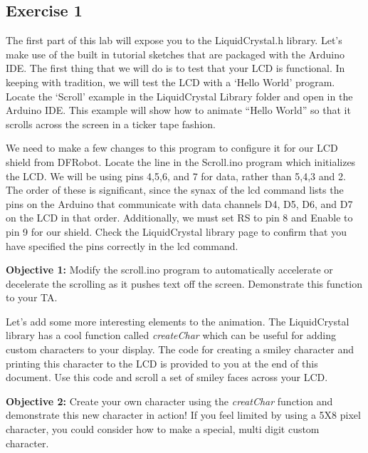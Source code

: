 \documentclass[10pt]{report}
\begin{document}
\subsection*{Exercise 1}
\par The first part of this lab will expose you to the LiquidCrystal.h library. Let’s make use of the built in tutorial sketches that are packaged with the Arduino IDE. The first thing that we will do is to test that your LCD is functional. In keeping with tradition, we will test the LCD with a ‘Hello World’ program. Locate the ‘Scroll’ example in the LiquidCrystal Library folder and open in the Arduino IDE. This example will show how to animate “Hello World” so that it scrolls across the screen in a ticker tape fashion.
\par We need to make a few changes to this program to configure it for our LCD shield from DFRobot. Locate the line in the Scroll.ino program which initializes the LCD. We will be using pins 4,5,6, and 7 for data, rather than 5,4,3 and 2. The order of these is significant, since the synax of the lcd command lists the pins on the Arduino that communicate with data channels D4, D5, D6, and D7 on the LCD in that order. Additionally, we must set RS to pin 8 and Enable to pin 9 for our shield. Check the LiquidCrystal library page to confirm that you have specified the pins correctly in the lcd command.
\par 
\textbf{Objective 1:} Modify the scroll.ino program to automatically accelerate or decelerate the scrolling as it pushes text off the screen. Demonstrate this function to your TA. 
\par Let’s add some more interesting elements to the animation. The LiquidCrystal library has a cool function called \emph{createChar}  which can be useful for adding custom characters to your display. The code for creating a smiley character and printing this character to the LCD is provided to you at the end of this document. Use this code and scroll a set of smiley faces across your LCD. 
\par
 \textbf{Objective 2:} Create your own character using the \emph{creatChar} function and demonstrate this new character in action! If you feel limited by using a 5X8 pixel character, you could consider how to make a special, multi digit custom character. 
\end{document}
